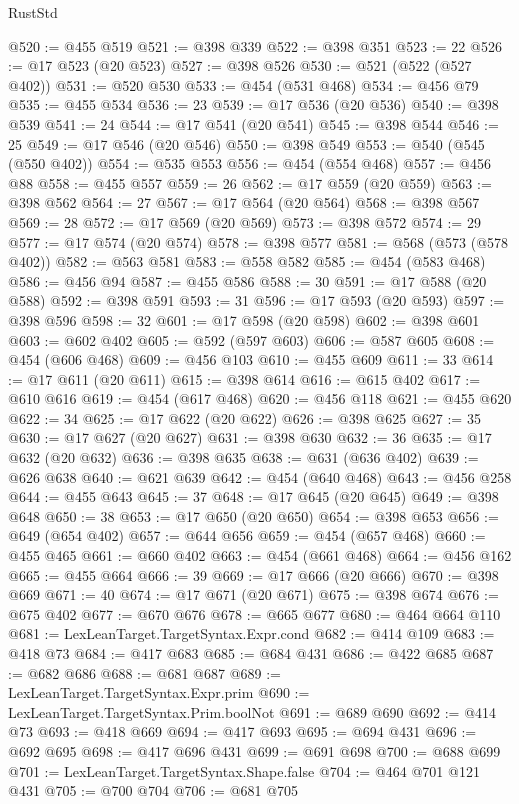 \begin{lexlean}{RustStd}
\begin{coremodule}
@520 := @455 @519
@521 := @398 @339
@522 := @398 @351
@523 := 22
@526 := @17 @523 (@20 @523)
@527 := @398 @526
@530 := @521 (@522 (@527 @402))
@531 := @520 @530
@533 := @454 (@531 @468)
@534 := @456 @79
@535 := @455 @534
@536 := 23
@539 := @17 @536 (@20 @536)
@540 := @398 @539
@541 := 24
@544 := @17 @541 (@20 @541)
@545 := @398 @544
@546 := 25
@549 := @17 @546 (@20 @546)
@550 := @398 @549
@553 := @540 (@545 (@550 @402))
@554 := @535 @553
@556 := @454 (@554 @468)
@557 := @456 @88
@558 := @455 @557
@559 := 26
@562 := @17 @559 (@20 @559)
@563 := @398 @562
@564 := 27
@567 := @17 @564 (@20 @564)
@568 := @398 @567
@569 := 28
@572 := @17 @569 (@20 @569)
@573 := @398 @572
@574 := 29
@577 := @17 @574 (@20 @574)
@578 := @398 @577
@581 := @568 (@573 (@578 @402))
@582 := @563 @581
@583 := @558 @582
@585 := @454 (@583 @468)
@586 := @456 @94
@587 := @455 @586
@588 := 30
@591 := @17 @588 (@20 @588)
@592 := @398 @591
@593 := 31
@596 := @17 @593 (@20 @593)
@597 := @398 @596
@598 := 32
@601 := @17 @598 (@20 @598)
@602 := @398 @601
@603 := @602 @402
@605 := @592 (@597 @603)
@606 := @587 @605
@608 := @454 (@606 @468)
@609 := @456 @103
@610 := @455 @609
@611 := 33
@614 := @17 @611 (@20 @611)
@615 := @398 @614
@616 := @615 @402
@617 := @610 @616
@619 := @454 (@617 @468)
@620 := @456 @118
@621 := @455 @620
@622 := 34
@625 := @17 @622 (@20 @622)
@626 := @398 @625
@627 := 35
@630 := @17 @627 (@20 @627)
@631 := @398 @630
@632 := 36
@635 := @17 @632 (@20 @632)
@636 := @398 @635
@638 := @631 (@636 @402)
@639 := @626 @638
@640 := @621 @639
@642 := @454 (@640 @468)
@643 := @456 @258
@644 := @455 @643
@645 := 37
@648 := @17 @645 (@20 @645)
@649 := @398 @648
@650 := 38
@653 := @17 @650 (@20 @650)
@654 := @398 @653
@656 := @649 (@654 @402)
@657 := @644 @656
@659 := @454 (@657 @468)
@660 := @455 @465
@661 := @660 @402
@663 := @454 (@661 @468)
@664 := @456 @162
@665 := @455 @664
@666 := 39
@669 := @17 @666 (@20 @666)
@670 := @398 @669
@671 := 40
@674 := @17 @671 (@20 @671)
@675 := @398 @674
@676 := @675 @402
@677 := @670 @676
@678 := @665 @677
@680 := @464 @664 @110
@681 := LexLeanTarget.TargetSyntax.Expr.cond
@682 := @414 @109
@683 := @418 @73
@684 := @417 @683
@685 := @684 @431
@686 := @422 @685
@687 := @682 @686
@688 := @681 @687
@689 := LexLeanTarget.TargetSyntax.Expr.prim
@690 := LexLeanTarget.TargetSyntax.Prim.boolNot
@691 := @689 @690
@692 := @414 @73
@693 := @418 @669
@694 := @417 @693
@695 := @694 @431
@696 := @692 @695
@698 := @417 @696 @431
@699 := @691 @698
@700 := @688 @699
@701 := LexLeanTarget.TargetSyntax.Shape.false
@704 := @464 @701 @121 @431
@705 := @700 @704
@706 := @681 @705

\end{coremodule}
\end{lexlean}
